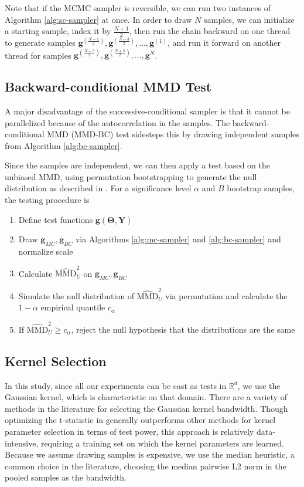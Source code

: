 \documentclass[a4paper,12pt]{article}
\begin{document}
Note that if the MCMC sampler is reversible, we can run two instances of Algorithm \ref{alg:sc-sampler} at once. In order to draw $N$ samples, we can initialize a starting sample, index it by $\frac{N+1}{2}$, then run the chain backward on one thread to generate samples $\mathbf{g}^{(\frac{N-1}{2})}, \mathbf{g}^{(\frac{N-3}{2})}, \ldots, \mathbf{g}^{(1)}$, and run it forward on another thread for samples $\mathbf{g}^{(\frac{N+3}{2})}, \mathbf{g}^{(\frac{N+5}{2})}, \ldots, \mathbf{g}^{N}$.

\subsection{Backward-conditional MMD Test}
A major disadvantage of the successive-conditional sampler is that it cannot be parallelized because of the autocorrelation in the samples. The backward-conditional MMD (MMD-BC) test sidesteps this by drawing independent samples from Algorithm \ref{alg:bc-sampler}. 

Since the samples are independent, we can then apply a test based on the unbiased MMD, using permutation bootstrapping to generate the null distribution as described in \cite{gretton_kernel_2012}. For a significance level $\alpha$ and $B$ bootstrap samples, the testing procedure is
\begin{enumerate}
    \item Define test functions $\mathbf{g}(\mathbf{\Theta}, \mathbf{Y})$
    \item Draw $\mathbf{g}_{MC}, \mathbf{g}_{BC}$ via Algorithms \ref{alg:mc-sampler} and \ref{alg:bc-sampler} and normalize scale
    \item Calculate $\widehat{\mathrm{MMD}}_{U}^{2}$ on $\mathbf{g}_{MC}, \mathbf{g}_{BC}$
    \item Simulate the null distribution of $\widehat{\mathrm{MMD}}_{U}^{2}$ via permutation and calculate the $1-\alpha$ empirical quantile $c_{\alpha}$
    \item If $\widehat{\mathrm{MMD}}_{U}^{2} \geq c_{\alpha}$, reject the null hypothesis that the distributions are the same
\end{enumerate}

\subsection{Kernel Selection}
In this study, since all our experiments can be cast as tests in $\mathbb{R}^{d}$, we use the Gaussian kernel, which is characteristic on that domain. There are a variety of methods in the literature for selecting the Gaussian kernel bandwidth. Though optimizing the t-statistic in \cite{sutherland_generative_2019} generally outperforms other methods for kernel parameter selection in terms of test power, this approach is relatively data-intensive, requiring a training set on which the kernel parameters are learned. Because we assume drawing samples is expensive, we use the median heuristic, a common choice in the literature, choosing the median pairwise L2 norm in the pooled samples as the bandwidth.
\end{document}

